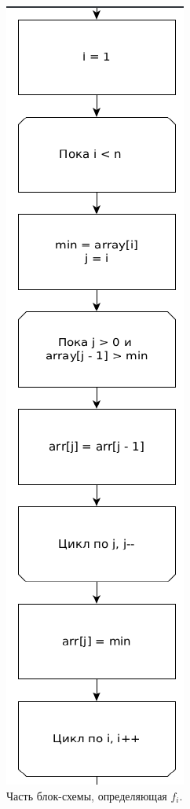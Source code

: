 \documentclass[12pt]{report}
\begin{document}
\begin{figure}
\begin{center}
\includegraphics[scale=0.5]{inc/img/insertionfi.png}
\captionsetup{justification=centering}
	\caption{Часть блок-схемы, определяющая $f_{i}$.}
	\label{img:insertion:fi}	
\end{center}
\end{figure}
\newpage 
\end{document}
